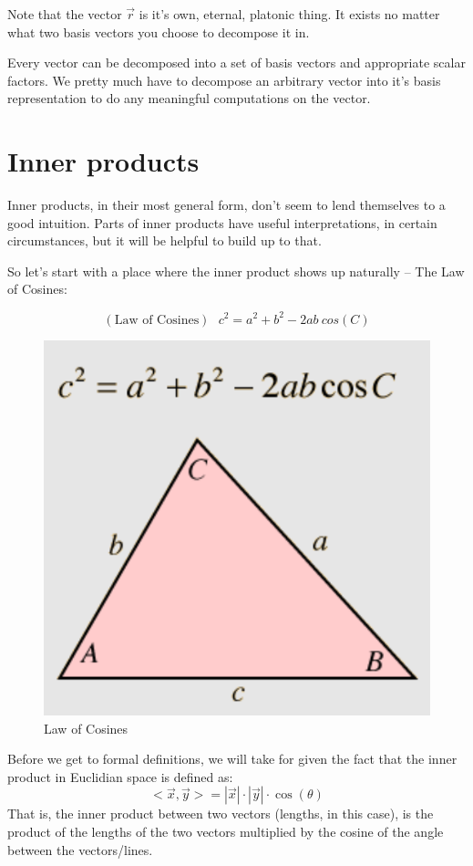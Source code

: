 \documentclass[
]{book}
\begin{document}
Note that the vector \(\vec{r}\) is it's own, eternal, platonic thing. It exists no matter what two basis vectors you choose to decompose it in.

Every vector can be decomposed into a set of basis vectors and appropriate scalar factors. We pretty much have to decompose an arbitrary vector into it's basis representation to do any meaningful computations on the vector.

\hypertarget{inner-products}{%
\section{Inner products}\label{inner-products}}

Inner products, in their most general form, don't seem to lend themselves to a good intuition. Parts of inner products have useful interpretations, in certain circumstances, but it will be helpful to build up to that.

So let's start with a place where the inner product shows up naturally -- The Law of Cosines:

\[(\text{Law of Cosines}) \ \ \  c^2 = a^2 + b^2 - 2 a b \ cos(C)\]

\begin{figure}

{\centering \includegraphics[width=0.5\linewidth,height=0.5\textheight]{images/law-of-cosines} 

}

\caption{Law of Cosines}\label{fig:unnamed-chunk-8}
\end{figure}

Before we get to formal definitions, we will take for given the fact that the inner product in Euclidian space is defined as:
\[<\vec{x},\vec{y}> = |\vec{x}| \cdot |\vec{y}| \cdot \cos(\theta)\]
That is, the inner product between two vectors (lengths, in this case), is the product of the lengths of the two vectors multiplied by the cosine of the angle between the vectors/lines.
\end{document}
